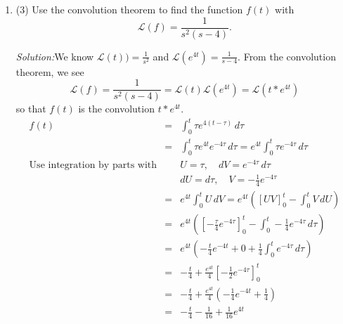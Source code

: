 \documentclass[12pt]{article}
\newcommand{\soln}{\noindent\textit{Solution:}}
\begin{document}
\begin{enumerate}
\item (3) Use the convolution theorem to find the function $f(t)$ with
\begin{equation}
\mathcal{L}(f) = \frac{1}{s^2(s-4)}.
\end{equation}

\soln We know $\mathcal{L}(t)) = \frac{1}{s^2}$ and
$\mathcal{L}(e^{4t}) = \frac{1}{s-4}$. From the convolution
theorem, we see
\[
\mathcal{L}(f) = \frac{1}{s^2(s-4)} = \mathcal{L}(t)
\mathcal{L}(e^{4t}) = \mathcal{L}(t * e^{4t}) 
\]
so that $f(t)$ is the convolution $t * e^{4t}$.
\begin{eqnarray*}
f(t) 
&=& \int_0^t \tau  e^{4(t-\tau )} \, d\tau \\
&=& \int_0^t \tau  e^{4t} e^{-4\tau } \, d\tau 
= e^{4t} \int_0^t \tau  e^{-4\tau } \, d\tau \\
\mbox{Use integration by parts with}
&& U = \tau , \quad dV = e^{-4\tau } \, d\tau \\
&& dU = d\tau , \quad V = -\frac{1}{4} e^{-4\tau }\\
&=& e^{4t} \int_0^t U \, dV
= e^{4t} \left( \left[ UV \right]_0^t - \int_0^t V \, dU \right)\\
&=& e^{4t} \left( \left[ - \frac{\tau }{4}e^{-4\tau } \right]_0^t - \int_0^t
-\frac{1}{4} e^{-4\tau } \, d\tau  \right)\\
&=& e^{4t} \left( - \frac{t}{4} e^{-4t} + 0 + \frac{1}{4} \int_0^t
e^{-4\tau } \, d\tau  \right)\\
&=& - \frac{t}{4} + \frac{e^{4t}}{4} \left[ -\frac{1}{2} e^{-4\tau }
\right]_0^t\\
&=& - \frac{t}{4} + \frac{e^{4t}}{4} \left( -\frac{1}{4} e^{-4t} +
\frac{1}{4} \right)\\
&=& - \frac{t}{4} - \frac{1}{16} + \frac{1}{16} e^{4t}
\end{eqnarray*}

\end{enumerate}

\vfill
\end{document}
